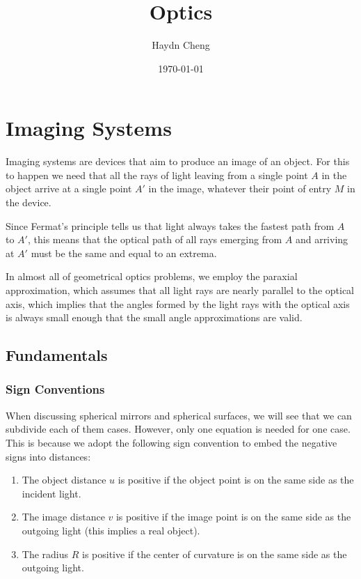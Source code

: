 \documentclass[english,a4paper,12pt]{report}
\title{Optics}
\author{Haydn Cheng}
\date{\today}
\begin{document}
\maketitle
\tableofcontents
    
\chapter{Imaging Systems}

Imaging systems are devices that aim to produce an image of an object. For this to happen we need that all the rays of light leaving from a single point \(A\) in the object arrive at a single point \(A'\) in the image, whatever their point of entry \(M\) in the device. 

Since Fermat's principle tells us that light always takes the fastest path from \(A\) to \(A'\), this means that the optical path of all rays emerging from \(A\) and arriving at \(A'\) must be the same and equal to an extrema.   

In almost all of geometrical optics problems, we employ the paraxial approximation, which assumes that all light rays are nearly parallel to the optical axis, which implies that the angles formed by the light rays with the optical axis is always small enough that the small angle approximations are valid.

\section{Fundamentals}

\subsection{Sign Conventions}

When discussing spherical mirrors and spherical surfaces, we will see that we can subdivide each of them cases. However, only one equation is needed for one case. This is because we adopt the following sign convention to embed the negative signs into distances:

\begin{enumerate}
    \item The object distance \(u\) is positive if the object point is on the same side as the incident light.
    \item The image distance \(v\) is positive if the image point is on the same side as the outgoing light (this implies a real object).
    \item The radius \(R\) is positive if the center of curvature is on the same side as the outgoing light.
\end{enumerate}
\end{document}
